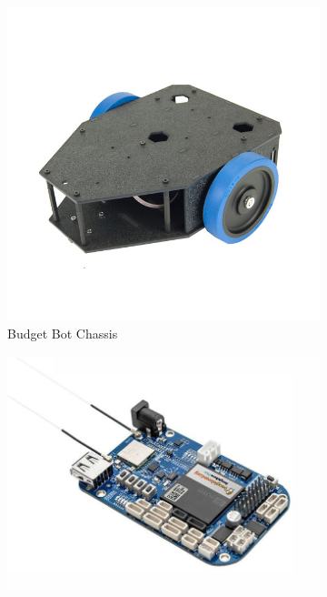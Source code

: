 \begin{figure}[H]
  \centering
  \begin{subfigure}[t]{0.32\textwidth}
    \includegraphics[width=1\textwidth]{figs/img/budgetbot_chassis}
    \captionsetup{width=\textwidth}
    \caption{Budget Bot Chassis}
    \label{fig:budgetBotChassis}
  \end{subfigure}
  \begin{subfigure}[t]{0.32\textwidth}
    \includegraphics[width=1\textwidth]{figs/img/beaglebone_blue}

\end{subfigure}
\end{figure}
